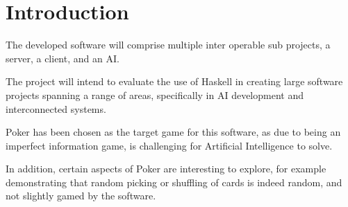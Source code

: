 \section{Introduction}
The developed software will comprise multiple inter operable sub projects, a server, a client, and an AI\@.

The project will intend to evaluate the use of Haskell\cite{hudak1992} in creating large software projects spanning a range of areas, specifically in AI development and interconnected systems.

Poker has been chosen as the target game for this software, as due to being an imperfect information game\cite{sandholm2010}, is challenging for Artificial Intelligence to solve.

In addition, certain aspects of Poker are interesting to explore, for example demonstrating that random picking or shuffling of cards is indeed random, and not slightly gamed by the software. 
